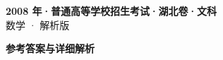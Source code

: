 \documentclass[zihao=-4, a4paper]{ctexart}
\begin{document}
\begin{center}
  {\Large\bfseries 2008 年·普通高等学校招生考试·湖北卷·文科}\\[4pt]
  {\large 数学 · 解析版}
\end{center}
\medskip
{}

\clearpage
{}
\begin{center}{\Large\bfseries 参考答案与详细解析}\end{center}
\medskip

\end{document}
